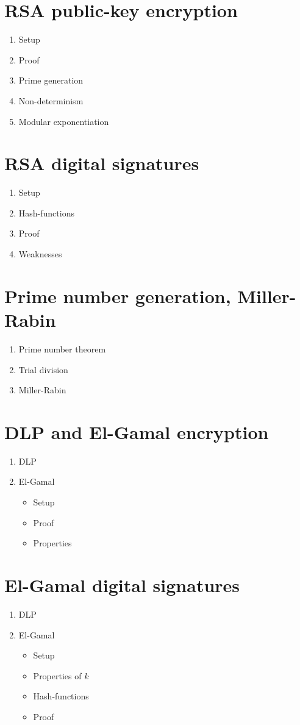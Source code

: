 \documentclass{article}
\begin{document}
\section{RSA public-key encryption}
\begin{enumerate}
\item Setup
\item Proof
\item Prime generation
\item Non-determinism
\item Modular exponentiation
\end{enumerate}
\clearpage

\section{RSA digital signatures}
\begin{enumerate}
\item Setup
\item Hash-functions
\item Proof
\item Weaknesses
\end{enumerate}
\clearpage

\section{Prime number generation, Miller-Rabin}
\begin{enumerate}
\item Prime number theorem
\item Trial division
\item Miller-Rabin
\end{enumerate}
\clearpage

\section{DLP and El-Gamal encryption}
\begin{enumerate}
\item DLP
\item El-Gamal
  \begin{itemize}
  \item Setup
  \item Proof
  \item Properties
  \end{itemize}
\end{enumerate}
\clearpage

\section{El-Gamal digital signatures}
\begin{enumerate}
\item DLP
\item El-Gamal
  \begin{itemize}
  \item Setup
  \item Properties of $k$
  \item Hash-functions
  \item Proof
  \end{itemize}
\end{enumerate}
\clearpage
\end{document}
